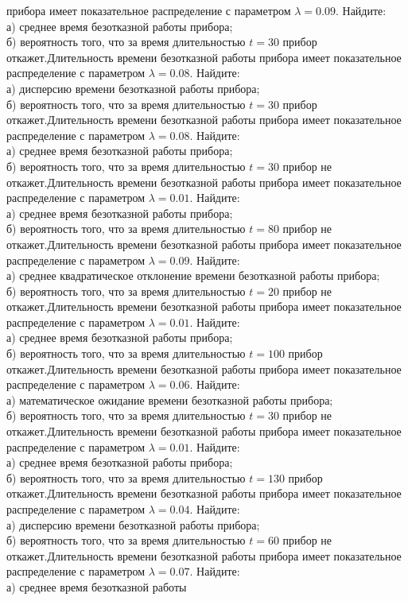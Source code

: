 прибора имеет показательное распределение с параметром $\lambda = 0.09$. Найдите: \\ \quad а) среднее время безотказной работы прибора; \\ \quad б) вероятность того, что за время длительностью $t = 30$ прибор откажет.Длительность времени безотказной работы прибора имеет показательное распределение с параметром $\lambda = 0.08$. Найдите: \\ \quad а) дисперсию времени безотказной работы прибора; \\ \quad б) вероятность того, что за время длительностью $t = 30$ прибор откажет.Длительность времени безотказной работы прибора имеет показательное распределение с параметром $\lambda = 0.08$. Найдите: \\ \quad а) среднее время безотказной работы прибора; \\ \quad б) вероятность того, что за время длительностью $t = 30$ прибор не откажет.Длительность времени безотказной работы прибора имеет показательное распределение с параметром $\lambda = 0.01$. Найдите: \\ \quad а) среднее время безотказной работы прибора; \\ \quad б) вероятность того, что за время длительностью $t = 80$ прибор не откажет.Длительность времени безотказной работы прибора имеет показательное распределение с параметром $\lambda = 0.09$. Найдите: \\ \quad а) среднее квадратическое отклонение времени безотказной работы прибора; \\ \quad б) вероятность того, что за время длительностью $t = 20$ прибор не откажет.Длительность времени безотказной работы прибора имеет показательное распределение с параметром $\lambda = 0.01$. Найдите: \\ \quad а) среднее время безотказной работы прибора; \\ \quad б) вероятность того, что за время длительностью $t = 100$ прибор откажет.Длительность времени безотказной работы прибора имеет показательное распределение с параметром $\lambda = 0.06$. Найдите: \\ \quad а) математическое ожидание времени безотказной работы прибора; \\ \quad б) вероятность того, что за время длительностью $t = 30$ прибор не откажет.Длительность времени безотказной работы прибора имеет показательное распределение с параметром $\lambda = 0.01$. Найдите: \\ \quad а) среднее время безотказной работы прибора; \\ \quad б) вероятность того, что за время длительностью $t = 130$ прибор откажет.Длительность времени безотказной работы прибора имеет показательное распределение с параметром $\lambda = 0.04$. Найдите: \\ \quad а) дисперсию времени безотказной работы прибора; \\ \quad б) вероятность того, что за время длительностью $t = 60$ прибор не откажет.Длительность времени безотказной работы прибора имеет показательное распределение с параметром $\lambda = 0.07$. Найдите: \\ \quad а) среднее время безотказной работы 